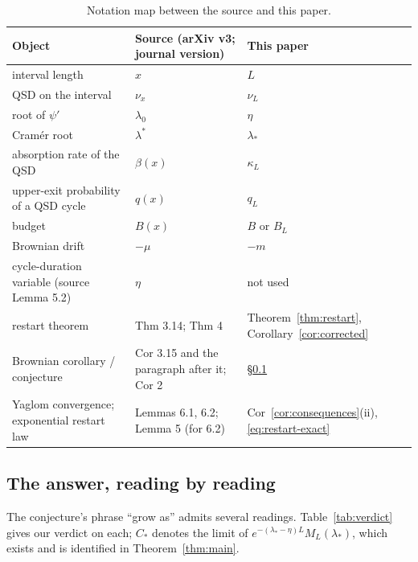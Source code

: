 \documentclass[11pt,a4paper]{article}
\theoremstyle{definition}
\theoremstyle{remark}
\newcommand{\1}{\mathbf 1}
\begin{document}
\begin{table}[t]
\centering\small
\caption{Notation map between the source \cite{garcia} and this paper.}\label{tab:map}
\begin{tabularx}{\textwidth}{@{}Xp{}p{}@{}}
\toprule
Object & Source (arXiv v3; journal version) & This paper\\
\midrule
interval length & $x$ & $L$\\
QSD on the interval & $\nu_x$ & $\nu_L$\\
root of $\psi'$ & $\lambda_0$ & $\eta$\\
Cram\'er root & $\lambda^*$ & $\lambda_*$\\
absorption rate of the QSD & $\beta(x)$ & $\kappa_L$\\
upper-exit probability of a QSD cycle & $q(x)$ & $q_L$\\
budget & $B(x)$ & $B$ or $B_L$\\
Brownian drift & $-\mu$ & $-m$\\
cycle-duration variable (source Lemma 5.2) & $\eta$ & not used\\
\midrule
restart theorem & Thm 3.14; Thm 4 & Theorem~\ref{thm:restart}, Corollary~\ref{cor:corrected}\\
Brownian corollary / conjecture & Cor 3.15 and the paragraph after it; Cor 2 & \S\ref{sec:verdict}\\
Yaglom convergence; exponential restart law & Lemmas 6.1, 6.2; Lemma 5 (for 6.2) & Cor~\ref{cor:consequences}(ii), \eqref{eq:restart-exact}\\
\bottomrule
\end{tabularx}
\end{table}

\subsection{The answer, reading by reading}\label{sec:verdict}
The conjecture's phrase ``grow as'' admits several readings. Table~\ref{tab:verdict} gives our verdict on each; $C_*$ denotes the limit of $e^{-(\lambda_*-\eta)L}M_L(\lambda_*)$, which exists and is identified in Theorem~\ref{thm:main}.
\end{document}

